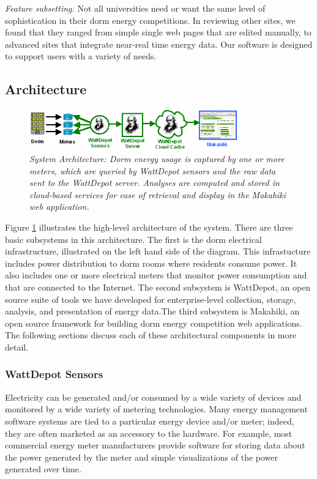 {\em Feature subsetting.} Not all universities need or want the same 
level of sophistication in their dorm energy competitions.  In reviewing 
other sites, we found that they ranged from simple single web pages that are 
edited manually, to advanced sites that integrate near-real time energy data. 
Our software is designed to support users with a variety of needs. 

\subsection{Architecture}

\begin{figure}[!th]
  \center
  \includegraphics[width=0.8\textwidth]{architecture.eps}
  \caption{\em \small System Architecture: Dorm energy usage is captured by one or more meters, which 
are queried by WattDepot sensors and the raw data sent to the WattDepot server. Analyses are computed
and stored in cloud-based services for ease of retrieval and display in the Makahiki web application.}
  \label{fig:architecture}
\end{figure} 

Figure \ref{fig:architecture} illustrates the high-level architecture of
the system. There are three basic subsystems in this architecture.  The
first is the dorm electrical infrastructure, illustrated on the left hand
side of the diagram.  This infrastucture includes power distribution to
dorm rooms where residents consume power.  It also includes one or more
electrical meters that monitor power consumption and that are connected to
the Internet.  The second subsystem is WattDepot, an open source suite of
tools we have developed for enterprise-level collection, storage, analysis,
and presentation of energy data.The third subsystem is Makahiki, an open
source framework for building dorm energy competition web applications.
The following sections discuss each of these architectural components in
more detail.

\subsubsection{WattDepot Sensors}

Electricity can be generated and/or consumed by a wide variety of devices
and monitored by a wide variety of metering technologies.  Many energy
management software systems are tied to a particular energy device and/or
meter; indeed, they are often marketed as an accessory to the hardware.
For example, most commercial energy meter manufacturers provide software
for storing data about the power generated by the meter and simple
visualizations of the power generated over time.

